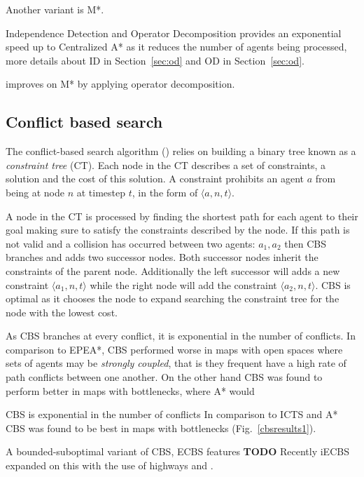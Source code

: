 \documentclass[a4paper,11pt]{article}
\begin{document}
Another variant is M*.

Independence Detection and Operator Decomposition provides an exponential speed up to Centralized A* as it reduces the number of agents being processed, more details about ID in Section~\ref{sec:od} and OD in Section~\ref{sec:od}.

\cite{ferner2013odrm} improves on M* by applying operator decomposition.

\subsection{Conflict based search} \label{sec:cbs}
The conflict-based search algorithm (\cite{sharon2015conflict}) relies on building a binary tree known as a  \textit{constraint tree} (CT). Each node in the CT describes a set of constraints, a solution and the cost of this solution. A constraint prohibits an agent $a$ from being at node $n$ at timestep $t$, in the form of $\langle a, n, t \rangle$.

A node in the CT is processed by finding the shortest path for each agent to their goal making sure to satisfy the constraints described by the node. If this path is not valid and a collision has occurred between two agents: $a_1, a_2$ then CBS branches and adds two successor nodes. Both successor nodes inherit the constraints of the parent node. Additionally the left successor will adds a new constraint $\langle a_1, n, t \rangle$ while the right node will add the constraint $\langle a_2, n, t \rangle$. CBS is optimal as it chooses the node to expand searching the constraint tree for the node with the lowest cost.

As CBS branches at every conflict, it is exponential in the number of conflicts. In comparison to EPEA*, CBS performed worse in maps with open spaces where sets of agents may be \textit{strongly coupled}, that is they frequent have a high rate of path conflicts between one another. On the other hand CBS was found to perform better in maps with bottlenecks, where A* would 


CBS is exponential in the number of conflicts In comparison to ICTS and A* CBS was found to be best in maps with bottlenecks (Fig.~\ref{cbsresults1}).

A bounded-suboptimal variant of CBS, ECBS features \cite{barer2014suboptimal} \textbf{TODO} Recently iECBS expanded on this with the use of highways and  \cite{cohen2016improved}.
\end{document}
